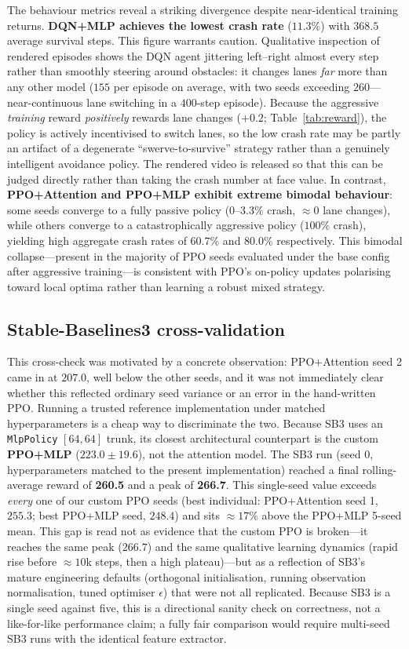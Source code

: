 \documentclass[conference]{IEEEtran}
\newcommand{\code}[1]{\texttt{#1}}
\begin{document}
The behaviour metrics reveal a striking divergence despite near-identical training
returns. \textbf{DQN+MLP achieves the lowest crash rate} ($11.3\%$) with
$368.5$ average survival steps. This figure warrants caution. Qualitative
inspection of rendered episodes shows the DQN agent jittering left--right almost
every step rather than smoothly steering around obstacles: it changes lanes
\emph{far} more than any other model ($155$ per episode on average, with two
seeds exceeding $260$---near-continuous lane switching in a $400$-step episode).
Because the aggressive \emph{training} reward \emph{positively} rewards lane
changes ($+0.2$; Table~\ref{tab:reward}), the policy is actively incentivised to
switch lanes, so the low crash rate may be partly an artifact of a degenerate
``swerve-to-survive'' strategy rather than a genuinely intelligent avoidance
policy. The rendered video is released so that this can be judged directly rather
than taking the crash number at face value. In contrast, \textbf{PPO+Attention and PPO+MLP exhibit
extreme bimodal behaviour}: some seeds converge to a fully passive policy
($0$--$3.3\%$ crash, $\approx 0$ lane changes), while others converge to a
catastrophically aggressive policy ($100\%$ crash), yielding high aggregate
crash rates of $60.7\%$ and $80.0\%$ respectively. This bimodal collapse---present
in the majority of PPO seeds evaluated under the base config after aggressive
training---is consistent with PPO's on-policy updates polarising toward local
optima rather than learning a robust mixed strategy.

\subsection{Stable-Baselines3 cross-validation}
This cross-check was motivated by a concrete observation: PPO+Attention seed 2
came in at $207.0$, well below the other seeds, and it was not immediately clear
whether this reflected ordinary seed variance or an error in the hand-written
PPO. Running a trusted reference implementation under matched hyperparameters is
a cheap way to discriminate the two. Because SB3 uses an \code{MlpPolicy}
$[64,64]$ trunk, its closest architectural counterpart is the custom
\textbf{PPO+MLP} ($223.0 \pm 19.6$), not the attention model. The SB3 run
(seed 0, hyperparameters matched to the present implementation) reached a final
rolling-average reward of \textbf{260.5} and a peak of \textbf{266.7}. This
single-seed value exceeds \emph{every} one of our custom PPO seeds (best
individual: PPO+Attention seed 1, $255.3$; best PPO+MLP seed, $248.4$) and sits
${\approx}17\%$ above the PPO+MLP 5-seed mean. This gap is read not as evidence
that the custom PPO is broken---it reaches the same peak ($266.7$) and the same
qualitative learning dynamics (rapid rise before ${\approx}10$k steps, then a
high plateau)---but as a reflection of SB3's mature engineering defaults
(orthogonal initialisation, running observation normalisation, tuned optimiser
$\epsilon$) that were not all replicated. Because SB3 is a single seed against
five, this is a directional sanity check on correctness, not a like-for-like
performance claim; a fully fair comparison would require multi-seed SB3 runs
with the identical feature extractor.
\end{document}
